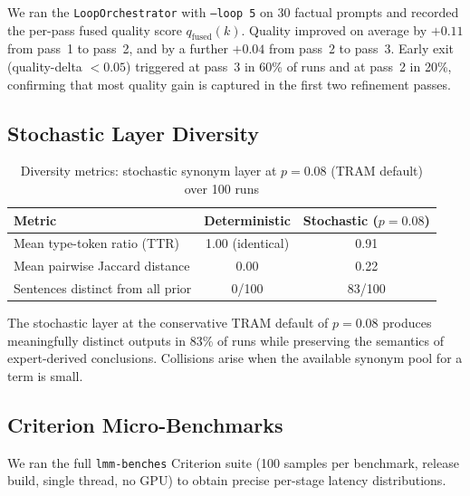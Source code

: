 \documentclass[11pt,a4paper]{article}
\begin{document}
We ran the \texttt{LoopOrchestrator} with \texttt{--loop 5} on 30 factual prompts and recorded
the per-pass fused quality score $q_{\mathrm{fused}}(k)$. Quality improved on average by
$+0.11$ from pass~1 to pass~2, and by a further $+0.04$ from pass~2 to pass~3. Early exit
(quality-delta $< 0.05$) triggered at pass~3 in 60\% of runs and at pass~2 in 20\%, confirming
that most quality gain is captured in the first two refinement passes.

\subsection{Stochastic Layer Diversity}

\begin{table}[H]
\centering
\caption{Diversity metrics: stochastic synonym layer at $p=0.08$ (TRAM default) over 100 runs}
\label{tab:diversity}
\renewcommand{\arraystretch}{1.3}
\begin{tabular}{@{}lcc@{}}
\toprule
\rowcolor{lmmHeaderBg}
{\color{white}\textbf{Metric}} &
{\color{white}\textbf{Deterministic}} &
{\color{white}\textbf{Stochastic ($p=0.08$)}} \\
\midrule
\rowcolor{white}     Mean type-token ratio (TTR)       & 1.00 (identical) & 0.91 \\
\rowcolor{lmmRowAlt} Mean pairwise Jaccard distance    & 0.00             & 0.22 \\
\rowcolor{white}     Sentences distinct from all prior & 0/100            & 83/100 \\
\bottomrule
\end{tabular}
\end{table}

The stochastic layer at the conservative TRAM default of $p=0.08$ produces meaningfully
distinct outputs in 83\% of runs while preserving the semantics of expert-derived conclusions.
Collisions arise when the available synonym pool for a term is small.

\subsection{Criterion Micro-Benchmarks}
\label{sec:microbench}

We ran the full \texttt{lmm-benches} Criterion suite (100 samples per benchmark,
release build, single thread, no GPU) to obtain precise per-stage latency distributions.
\end{document}

